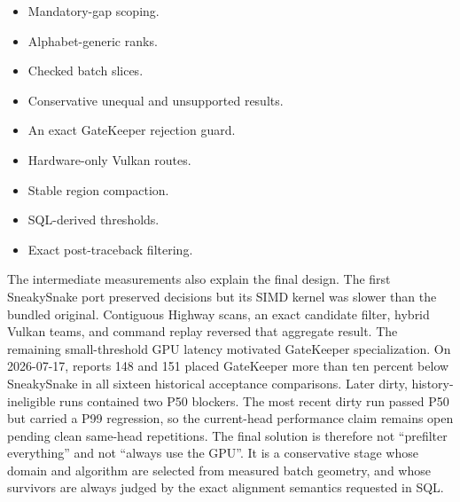 \begin{itemize}
    \item Mandatory-gap scoping.
    \item Alphabet-generic ranks.
    \item Checked batch slices.
    \item Conservative unequal and unsupported results.
    \item An exact GateKeeper rejection guard.
    \item Hardware-only Vulkan routes.
    \item Stable region compaction.
    \item SQL-derived thresholds.
    \item Exact post-traceback filtering.
\end{itemize}

The intermediate measurements also explain the final design.  The first
SneakySnake port preserved decisions but its SIMD kernel was slower than the
bundled original.  Contiguous Highway scans, an exact candidate filter, hybrid
Vulkan teams, and command replay reversed that aggregate result.  The remaining
small-threshold GPU latency motivated GateKeeper specialization.  On 2026-07-17,
reports 148 and 151 placed GateKeeper more than ten percent below SneakySnake
in all sixteen historical acceptance comparisons.  Later dirty,
history-ineligible runs contained two P50 blockers.  The most recent dirty run
passed P50 but carried a P99 regression, so the current-head performance claim
remains open pending clean same-head repetitions.  The final solution is
therefore not
``prefilter everything'' and not ``always use the GPU''.  It is a conservative
stage whose domain and algorithm are selected from measured batch geometry,
and whose survivors are always judged by the exact alignment semantics
requested in SQL.
